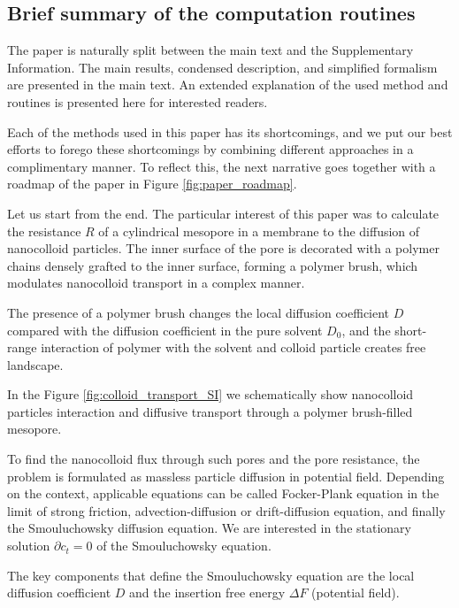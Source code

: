 \documentclass[12pt, a4paper]{article}
\begin{document}
\subsection*{Brief summary of the computation routines}

The paper is naturally split between the main text and the Supplementary Information. 
The main results, condensed description, and simplified formalism are presented in the main text.
An extended explanation of the used method and routines is presented here for interested readers. 

Each of the methods used in this paper has its shortcomings, and we put our best efforts to forego these shortcomings by combining different approaches in a complimentary manner. 
To reflect this, the next narrative goes together with a roadmap of the paper in Figure \ref{fig:paper_roadmap}.

Let us start from the end. The particular interest of this paper was to calculate the resistance $R$ of a cylindrical mesopore in a membrane to the diffusion of nanocolloid particles. 
The inner surface of the pore is decorated with a polymer chains densely grafted to the inner surface, forming a polymer brush, which modulates nanocolloid transport in a complex manner.

The presence of a polymer brush changes the local diffusion coefficient $D$ compared with the diffusion coefficient in the pure solvent $D_0$, and the short-range interaction of polymer with the solvent and colloid particle creates free landscape.

In the Figure \ref{fig:colloid_transport_SI} we schematically show nanocolloid particles interaction and diffusive transport through a polymer brush-filled mesopore. 

To find the nanocolloid flux through such pores and the pore resistance, the problem is formulated as massless particle diffusion in potential field.
Depending on the context, applicable equations can be called Focker-Plank equation in the limit of strong friction, advection-diffusion or drift-diffusion equation, and finally the Smouluchowsky diffusion equation.
We are interested in the stationary solution $\partial c_t = 0$ of the Smouluchowsky equation.

The key components that define the Smouluchowsky equation are the local diffusion coefficient $D$ and the insertion free energy $\Delta F$ (potential field). 
\end{document}
